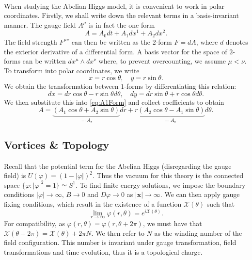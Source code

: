 \documentclass[11pt, fleqn]{article}
\begin{document}
\paragraph{} When studying the Abelian Higgs model, it is convenient to work in polar coordinates. Firstly, we shall write down the relevant terms in a basis-invariant manner. The gauge field $ A^\mu $ is in fact the one form 
	\begin{equation}\label{eq:A1Form}
		A = A_0 dt + A_1 dx^1 + A_2 dx^2.
	\end{equation}
The field strength $ F^{\mu\nu} $ can then be written as the $ 2 $-form $ F = dA $, where $ d $ denotes the exterior derivative of a differential form. A basis vector for the space of $ 2 $-forms can be written $ dx^\mu \wedge dx^\nu $ where, to prevent overcounting, we assume $ \mu < \nu $. To transform into polar coordinates, we write
	\begin{equation}\label{key}
		x = r \cos \theta, \quad y = r \sin \theta.
	\end{equation}
We obtain the transformation between $ 1 $-forms by differentiating this relation:
	\begin{equation}\label{key}
		dx = dr \cos \theta - r \sin \theta d \theta, \quad dy = dr \sin \theta + r \cos \theta d \theta.
	\end{equation}
We then substitute this into \eqref{eq:A1Form} and collect coefficients to obtain
	\begin{equation}\label{key}
		A = \underbrace{(A_1 \cos \theta + A_2 \sin \theta)}_{\eqqcolon A_r} dr + \underbrace{r(A_2 \cos \theta - A_1 \sin \theta)}_{\eqqcolon A_\theta} d\theta.
	\end{equation}
	
\subsection{Vortices \& Topology}

\paragraph{} Recall that the potential term for the Abelian Higgs (disregarding the gauge field) is $ U(\varphi) = (1 - |\varphi|)^2 $. Thus the vacuum for this theory is the connected space $ \{ \varphi : |\varphi|^2 = 1 \} \simeq S^1 $. To find finite energy solutions, we impose the boundary conditions $ |\varphi| \to \infty $, $ B \to 0 $ and $ D \varphi \to 0 $ as $ |\mathbf{x}| \to \infty $. We can then apply gauge fixing conditions, which result in the existence of a function $ \mathcal{X} (\theta) $ such that
	\begin{equation}\label{key}
		\lim_{r \to \infty} \varphi(r,\theta) = e^{i \mathcal{X}(\theta)}.
	\end{equation}
For compatibility, as $ \varphi(r, \theta) = \varphi(r, \theta + 2\pi) $, we must have that $ \mathcal{X}(\theta + 2\pi) = \mathcal{X}(\theta) + 2 \pi N $. We then refer to $ N $ as the winding number of the field configuration. This number is invariant under gauge transformation, field transformations and time evolution, thus it is a topological charge.
\end{document}

